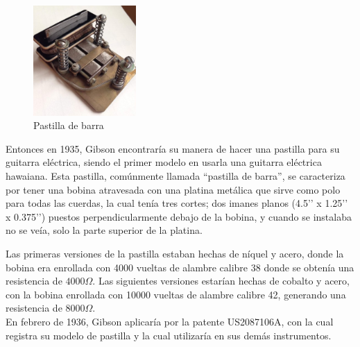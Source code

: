 \documentclass{article}
\begin{document}
\begin{figure}
    \centering
    \includegraphics[width=0.35\textwidth]{images/pickup.jpg}
    \vspace{-5pt}
    \caption{Pastilla de barra}
\end{figure}

Entonces en 1935, Gibson encontraría su manera de hacer una pastilla para su guitarra eléctrica, siendo el primer modelo en usarla una guitarra eléctrica hawaiana. Esta pastilla, comúnmente llamada “pastilla de barra”, se caracteriza por tener una bobina atravesada con una platina metálica que sirve como polo para todas las cuerdas, la cual tenía tres cortes; dos imanes planos (4.5’’ x 1.25’’ x 0.375’’) puestos perpendicularmente debajo de la bobina, y cuando se instalaba no se veía, solo la parte superior de la platina.\\

\endgroup

Las primeras versiones de la pastilla estaban hechas de níquel y acero, donde la bobina era enrollada con 4000 vueltas de alambre calibre 38 donde se obtenía una resistencia de $4000 \Omega$. Las siguientes versiones estarían hechas de cobalto y acero, con la bobina enrollada con 10000 vueltas de alambre calibre 42, generando una resistencia de $8000 \Omega$. \\

En febrero de 1936, Gibson aplicaría por la patente US2087106A, con la cual registra su modelo de pastilla y la cual utilizaría en sus demás instrumentos.\\
\end{document}

